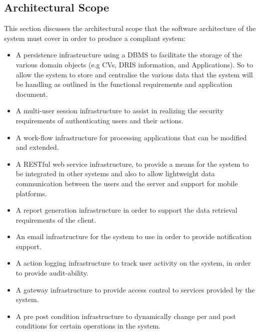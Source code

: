 \documentclass[12pt]{article}
\begin{document}
\subsection{Architectural Scope}
This section discusses the architectural scope that the software architecture of the system must cover in order to produce a compliant system:
\begin{itemize}
\item A persistence infrastructure using a DBMS to facilitate the storage of the various domain objects (e.g CVs, DRIS information, and Applications). So to allow the system to store and centralise the various data that the system will be handling as outlined in the functional requirements and application document.
\item A multi-user session infrastructure to assist in realizing the security requirements of authenticating users and their actions.
\item A work-flow infrastructure for processing applications that can be modified and extended. 
\item A RESTful web service infrastructure, to provide a means for the system to be integrated in other systems and also to allow lightweight data communication between the users and the server and support for mobile platforms. 
\item A report generation infrastructure in order to support the data retrieval requirements of the client.
\item An email infrastructure for the system to use in order to provide notification support.
\item A action logging infrastructure to track user activity on the system, in order to provide audit-ability.
\item A gateway infrastructure to provide access control to services provided by the system.
\item A pre post condition infrastructure to dynamically change per and post conditions for certain operations in the system.
\end{itemize}

\newpage
\end{document}
